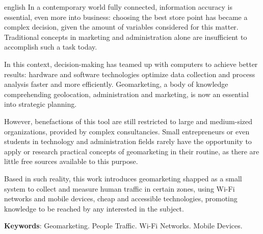 \documentclass[
		12pt,				%
		openright,			%
		oneside,			%
		a4paper,			%
		chapter=TITLE,		%
		english,			%
		brazil				%
	]{abntex2}
\newif\iffinal
\begin{document}
	\begin{resumo}[Abstract]
	 	\begin{otherlanguage*}{english}
    In a contemporary world fully connected, information accuracy is essential, even more into business: choosing the best store point has became a complex decision, given the amount of variables considered for this matter. Traditional concepts in marketing and administration alone are insufficient to accomplish such a task today.
		
In this context, decision-making has teamed up with computers to achieve better results: hardware and software technologies optimize data collection and process analysis faster and more efficiently. Geomarketing, a body of knowledge comprehending geolocation, administration and marketing, is now an essential into strategic planning.

However, benefactions of this tool are still restricted to large and medium-sized organizations, provided by complex consultancies. Small entrepreneurs or even students in  technology and administration fields rarely have the opportunity to apply or research practical concepts of geomarketing in their routine, as there are little free sources available to this purpose.

Based in such reality, this work introduces geomarketing shapped as a small system to collect and measure human traffic in certain zones, using Wi-Fi networks and mobile devices, cheap and accessible technologies, promoting knowledge to be reached by any interested in the subject.

		\textbf{Keywords}: Geomarketing. People Traffic. Wi-Fi Networks. Mobile Devices.

		\end{otherlanguage*}

	\end{resumo}

\fi


\iffinal
	\pdfbookmark[0]{\listfigurename}{lof}
	\listoffigures*
	\cleardoublepage
\fi


\iffinal
	\pdfbookmark[0]{\listtablename}{lot}
	\listoftables*
	\cleardoublepage
\fi
\end{document}
